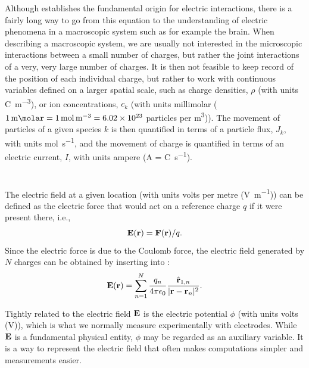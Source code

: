 Although  establishes the fundamental origin for electric interactions, there is a fairly long way to go from this equation to the understanding of electric phenomena in a macroscopic system such as for example the brain. When describing a macroscopic system, we are usually not interested in the microscopic interactions between a small number of charges, but rather the joint interactions of a very, very large number of charges. It is then not feasible to keep record of the position of each individual charge, but rather to work with continuous variables defined on a larger spatial scale, such as charge densities, $\rho$ (with units \si{\coulomb\per\cubic\metre}), or ion concentrations, $c_k$ (with units millimolar ($1\, \si{\milli\molar} = 1 \,\si{\mole\per\cubic\metre} = 6.02\times10^{23}$ particles per \si{\cubic\metre})). The movement of particles of a given species $k$ is then quantified in terms of a particle flux, $J_k$, with units \si{\mole\per\second}, and the movement of charge is quantified in terms of an electric current, $I$, with units ampere (\si{\ampere} = \si{\coulomb\per\second}).



\section{}
\label{sec:Basics:Fields} 
The electric field at a given location (with units volts per metre (\si{\volt\per\metre})) can be defined as the electric force that would act on a reference charge $q$ if it were present there, i.e.,
\begin{equation}
{\bf E}({\bf r}) = {\bf F}({\bf r})/q.
\label{eq:Basics:E}
\end{equation}
Since the electric force is due to the Coulomb force, the electric field generated by $N$ charges can be obtained by inserting  into :
\begin{equation}
{\bf E}({\bf r}) = \sum_{n=1}^{N}  \frac{q_n}{4\pi \epsilon_0} \frac{\hat{{\bf r}}_{1,n}}{|{\bf r}-{\bf r}_n|^2}.
\label{eq:Basics:CoulombEN}
\end{equation}

Tightly related to the electric field ${\bf E}$ is the electric potential $\phi$ (with units volts (\si{\volt})), which is what we normally measure experimentally with electrodes. While ${\bf E}$ is a fundamental physical entity, $\phi$ may be regarded as an auxiliary variable. 
It is a way to represent the electric field that often makes computations simpler and measurements easier.

